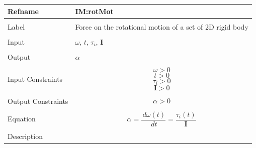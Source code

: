 \documentclass[12pt]{article}
\begin{document}
\noindent \begin{minipage}{\textwidth}
          \begin{tabular}{>{\raggedright}p{}>{\raggedright\arraybackslash}p{}}
          \toprule \textbf{Refname} & \textbf{IM:rotMot}
          \label{IM:rotMot}
          \\ \midrule \\
          Label & Force on the rotational motion of a set of 2D rigid body
          \\ \midrule \\
          Input & $ω$, $t$, ${τ_{i}}$, $\mathbf{I}$
          \\ \midrule \\
          Output & $α$
          \\ \midrule \\
          Input Constraints & \begin{displaymath}
                              ω>0
                              \end{displaymath}
                              \begin{displaymath}
                              t>0
                              \end{displaymath}
                              \begin{displaymath}
                              {τ_{i}}>0
                              \end{displaymath}
                              \begin{displaymath}
                              \mathbf{I}>0
                              \end{displaymath}
          \\ \midrule \\
          Output Constraints & \begin{displaymath}
                               α>0
                               \end{displaymath}
          \\ \midrule \\
          Equation & \begin{displaymath}
                     α=\frac{\,dω\left(t\right)}{\,dt}=\frac{{τ_{i}}\left(t\right)}{\mathbf{I}}
                     \end{displaymath}
          \\ \midrule \\
          Description & \begin{symbDescription}

\end{symbDescription}
\end{tabular}
\end{minipage}
\end{document}
